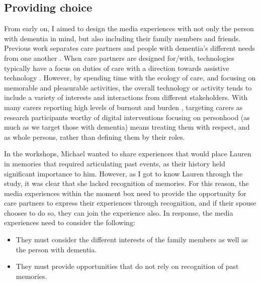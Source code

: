 \subsection{Providing choice}
\label{DR:ProvidingChoice}
From early on, I aimed to design the media experiences with not only the person with dementia in mind, but also including their family members and friends. Previous work separates care partners and people with dementia's different needs from one another \citep{suijkerbuijk_active_2019}. When care partners are designed for/with, technologies typically have a focus on duties of care with a direction towards assistive technology \citep{bennett_assistive_2017,bharucha2009intelligent,gibson2015everyday}. However, by spending time with the ecology of care, and focusing on memorable and pleasurable activities, the overall technology or activity tends to include a variety of interests and interactions from different stakeholders. With many carers reporting high levels of burnout and burden \citep{takai_experience_2009}, targeting carers as research participants worthy of digital interventions focusing on personhood (as much as we target those with dementia) means treating them with respect, and as whole persons, rather than defining them by their roles.

In the workshops, Michael wanted to share experiences that would place Lauren in memories that required articulating past events, as their history held significant importance to him. However, as I got to know Lauren through the study, it was clear that she lacked recognition of memories. For this reason, the media experiences within the moment box need to provide the opportunity for care partners to express their experiences through recognition, and if their spouse chooses to do so, they can join the experience also. In response, the media experiences need to consider the following:
\begin{itemize}
    \item They must consider the different interests of the family members as well as the person with dementia. 
    \item They must provide opportunities that do not rely on recognition of past memories.
\end{itemize}

